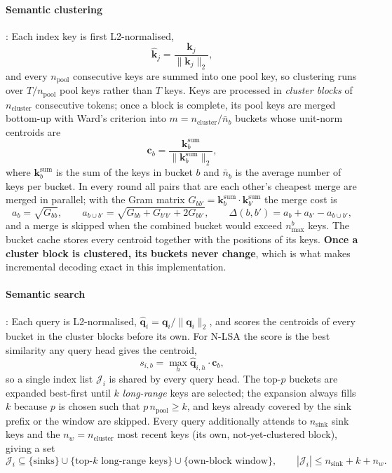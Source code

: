 \paragraph{Semantic clustering}: Each index key is first L2-normalised,
\[
\hat{\mathbf{k}}_j = \frac{\mathbf{k}_j}{\lVert \mathbf{k}_j \rVert_2},
\]
and every $n_{\text{pool}}$ consecutive keys are summed into one pool key, so clustering runs over $T/n_{\text{pool}}$ pool keys rather than $T$ keys. Keys are processed in \emph{cluster blocks} of $n_{\text{cluster}}$ consecutive tokens; once a block is complete, its pool keys are merged bottom-up with Ward's criterion into $m = n_{\text{cluster}}/\bar{n}_b$ buckets whose unit-norm centroids are
\[
\mathbf{c}_b = \frac{\mathbf{k}^{\text{sum}}_b}{\lVert \mathbf{k}^{\text{sum}}_b \rVert_2},
\]
where $\mathbf{k}^{\text{sum}}_b$ is the sum of the keys in bucket $b$ and $\bar{n}_b$ is the average number of keys per bucket. In every round all pairs that are each other's cheapest merge are merged in parallel; with the Gram matrix $G_{bb'} = \mathbf{k}^{\text{sum}}_b \cdot \mathbf{k}^{\text{sum}}_{b'}$ the merge cost is
\[
a_b = \sqrt{G_{bb}}, \qquad a_{b \cup b'} = \sqrt{G_{bb} + G_{b'b'} + 2G_{bb'}}, \qquad \Delta(b,b') = a_b + a_{b'} - a_{b \cup b'},
\]
and a merge is skipped when the combined bucket would exceed $n_{\max}^b$ keys. The bucket cache stores every centroid together with the positions of its keys. \textbf{Once a cluster block is clustered, its buckets never change}, which is what makes incremental decoding exact in this implementation.

\paragraph{Semantic search}: Each query is L2-normalised, $\hat{\mathbf{q}}_i = \mathbf{q}_i/\lVert \mathbf{q}_i \rVert_2$, and scores the centroids of every bucket in the cluster blocks before its own. For N-LSA the score is the best similarity any query head gives the centroid,
\[
s_{i,b} = \max_h \hat{\mathbf{q}}_{i,h} \cdot \mathbf{c}_b,
\]
so a single index list $\mathcal{J}_i$ is shared by every query head. The top-$p$ buckets are expanded best-first until $k$ \emph{long-range} keys are selected; the expansion always fills $k$ because $p$ is chosen such that $p\, n_{\text{pool}} \ge k$, and keys already covered by the sink prefix or the window are skipped. Every query additionally attends to $n_{\text{sink}}$ sink keys and the $n_w = n_{\text{cluster}}$ most recent keys (its own, not-yet-clustered block), giving a set
\[
\mathcal{J}_i \subseteq \{\text{sinks}\} \cup \{\text{top-}k \text{ long-range keys}\} \cup \{\text{own-block window}\}, \qquad |\mathcal{J}_i| \le n_{\text{sink}} + k + n_w .
\]

